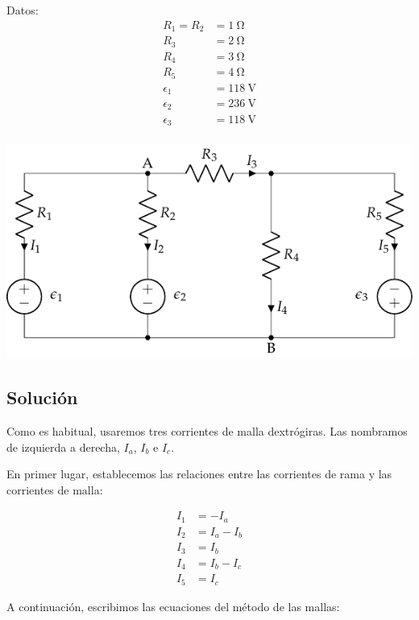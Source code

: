 \documentclass[10pt]{article}
\begin{document}
\begin{minipage}{0.4\linewidth}
  Datos:
  \begin{align*}
    R_1 = R_2 &= \SI{1}{\ohm}\\
    R_3 &= \SI{2}{\ohm}\\
    R_4 &= \SI{3}{\ohm}\\
    R_5 &= \SI{4}{\ohm}\\
    \epsilon_1 &= \SI{118}{\volt}\\
    \epsilon_2 &= \SI{236}{\volt}\\
    \epsilon_3 &= \SI{118}{\volt}\\
  \end{align*}
\end{minipage}
\begin{minipage}{0.6\linewidth}
  \includegraphics{figs/mallas2.pdf}
\end{minipage}

\subsection*{Solución}

Como es habitual, usaremos tres corrientes de malla dextrógiras. Las nombramos de izquierda a derecha, $I_a$, $I_b$ e $I_c$.

En primer lugar, establecemos las relaciones entre las corrientes de rama y las corrientes de malla:

\begin{align*}
  I_1 &= -I_a\\
  I_2 &= I_a - I_b\\
  I_3 &= I_b\\
  I_4 &= I_b - I_c\\
  I_5 &= I_c
\end{align*}

A continuación, escribimos las ecuaciones del método de las mallas:
\end{document}
